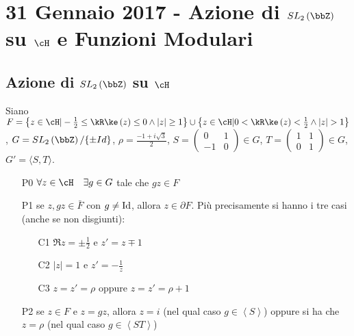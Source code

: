 \chapter{31 Gennaio 2017 - Azione di $SL_2 \left( \bbZ \right)$ su $\cH$ e Funzioni Modulari}
\justify

\section{Azione di $SL_2 \left( \bbZ \right)$ su $\cH$}

Siano $F=\left\{z \in \cH | -\frac{1}{2} \leq \Re(z) \leq 0
\wedge |z| \geq 1 \right\} \cup
\left\{z \in \cH | 0 < \Re(z) < \frac{1}{2} \wedge |z| > 1 \right\}$,
$G=SL_2 \left( \bbZ \right)/\{\pm Id\}$,   $\rho=\frac{-1+i\sqrt{3}}{2}$,
$S=\left( \begin{array}{cc} 0 & 1 \\ -1 & 0 \end{array} \right) \in G$,
$T=\left( \begin{array}{cc} 1 & 1 \\ 0 & 1 \end{array} \right) \in G$,
$G' = \langle S, T \rangle$.

\begin{teorema}
\begin{itemize}
\item[P0] $\forall z \in \cH \quad \exists g \in G$ tale che $gz \in F$
\item[P1] se $z,gz \in \bar{F}$ con $g \neq \text{Id}$, allora $z \in \partial F$.
  Più precisamente si hanno i tre casi (anche se non disgiunti):
  \begin{enumerate}
  \item[C1] $\Re z = \pm \frac{1}{2}$ e $z' = z \mp 1$
  \item[C2] $|z| = 1$ e $z' = - \frac{1}{z}$
  \item[C3] $z = z' = \rho$ oppure $z = z' = \rho + 1$
  \end{enumerate}
\item[P2] se $z \in F$ e $z=gz$,
  allora $z=i$ (nel qual caso $g \in \left\langle S \right\rangle$) oppure si ha che
  $z= \rho$ (nel qual caso $g \in \left\langle ST \right\rangle$)
\end{itemize}
\end{teorema}

